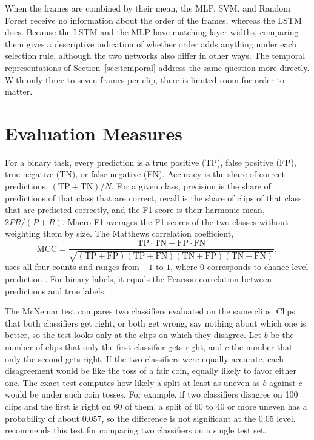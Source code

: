When the frames are combined by their mean, the MLP, SVM, and Random Forest receive no information about the order of the frames, whereas the LSTM does. Because the LSTM and the MLP have matching layer widths, comparing them gives a descriptive indication of whether order adds anything under each selection rule, although the two networks also differ in other ways. The temporal representations of Section~\ref{sec:temporal} address the same question more directly. With only three to seven frames per clip, there is limited room for order to matter.



\section{Evaluation Measures}
\label{sec:measures}

For a binary task, every prediction is a true positive (TP), false positive (FP), true negative (TN), or false negative (FN). Accuracy is the share of correct predictions, $(\mathrm{TP} + \mathrm{TN}) / N$. For a given class, precision is the share of predictions of that class that are correct, recall is the share of clips of that class that are predicted correctly, and the F1 score is their harmonic mean, $2PR/(P + R)$. Macro F1 averages the F1 scores of the two classes without weighting them by size. The Matthews correlation coefficient,
\begin{equation}
   \mathrm{MCC} = \frac{\mathrm{TP} \cdot \mathrm{TN} - \mathrm{FP} \cdot \mathrm{FN}}{\sqrt{(\mathrm{TP}+\mathrm{FP})(\mathrm{TP}+\mathrm{FN})(\mathrm{TN}+\mathrm{FP})(\mathrm{TN}+\mathrm{FN})}},
   \label{eq:mcc}
\end{equation}
uses all four counts and ranges from $-1$ to $1$, where 0 corresponds to chance-level prediction \cite{chicco2020}. For binary labels, it equals the Pearson correlation between predictions and true labels.

The McNemar test \cite{mcnemar1947} compares two classifiers evaluated on the same clips. Clips that both classifiers get right, or both get wrong, say nothing about which one is better, so the test looks only at the clips on which they disagree. Let $b$ be the number of clips that only the first classifier gets right, and $c$ the number that only the second gets right. If the two classifiers were equally accurate, each disagreement would be like the toss of a fair coin, equally likely to favor either one. The exact test computes how likely a split at least as uneven as $b$ against $c$ would be under such coin tosses. For example, if two classifiers disagree on 100 clips and the first is right on 60 of them, a split of 60 to 40 or more uneven has a probability of about 0.057, so the difference is not significant at the 0.05 level.  recommends this test for comparing two classifiers on a single test set.

